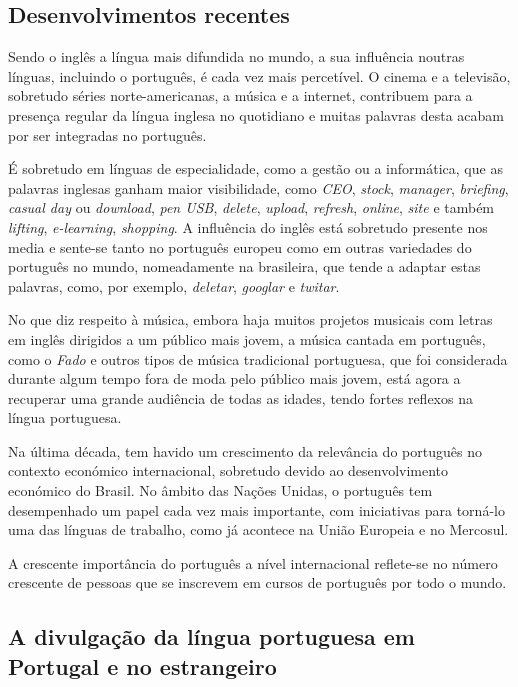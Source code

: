 \begin{multicols}{2}
\subsection{Desenvolvimentos recentes}

Sendo o inglês a língua mais difundida no mundo, a sua influência noutras línguas, incluindo o português, é cada vez mais percetível. O cinema e a televisão, sobretudo séries norte-americanas, a música e a internet, contribuem para a presença regular da língua inglesa no quotidiano e muitas palavras desta acabam por ser integradas no português.

É sobretudo em línguas de especialidade, como a gestão ou a informática, que as palavras inglesas ganham maior visibilidade, como \textit{CEO}, \textit{stock}, \textit{ma\-na\-ger}, \textit{briefing}, \textit{casual day} ou \textit{download}, \textit{pen USB}, \textit{delete}, \textit{upload}, \textit{refresh}, \textit{online}, \textit{site} e também \textit{lifting}, \textit{e-learning}, \textit{shopping}. A influência do inglês está sobretudo presente nos media e sente-se tanto no português europeu como em outras variedades do português no mundo, nomeadamente na brasileira, que tende a adaptar estas palavras, como, por exemplo, \textit{deletar}, \textit{googlar} e \textit{twitar}.

No que diz respeito à música, embora haja muitos projetos musicais com letras em inglês dirigidos a um público mais jovem, a música cantada em português, como o \textit{Fado} e outros tipos de música tradicional portuguesa, que foi considerada durante algum tempo fora de moda pelo público mais jovem, está agora a recuperar uma grande audiência de todas as idades, tendo fortes reflexos na língua portuguesa.

Na última década, tem havido um crescimento da relevância do português no contexto económico internacional, sobretudo devido ao desenvolvimento económico do Brasil. No âmbito das Nações Unidas, o português tem desempenhado um papel cada vez mais importante, com iniciativas para torná-lo uma das línguas de trabalho, como já acontece na União Europeia e no Mercosul.

A crescente importância do português a nível internacional reflete-se no número crescente de pessoas que se inscrevem em cursos de português por todo o mundo.

\subsection{A divulgação da língua portuguesa em Por\-tu\-gal e no es\-tran\-gei\-ro}


\end{multicols}
